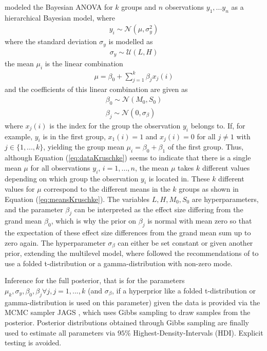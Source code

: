 \cite{Kruschke2015} modeled the Bayesian ANOVA for $k$ groups and $n$ observations $y_1,...y_n$ as a hierarchical Bayesian model, where
\begin{align}\label{eq:dataKruschke}
	y_i \sim \mathcal{N}(\mu,\sigma_y^2)
\end{align}
where the standard deviation $\sigma_y$ is modelled as
\begin{align}
	\sigma_y \sim \mathcal{U}(L,H)
\end{align}
the mean $\mu_i$ is the linear combination
\begin{align}\label{eq:meansKruschke}
	\mu=\beta_0+\sum_{j=1}^k \beta_j x_j(i)
\end{align}
and the coefficients of this linear combination are given as
\begin{align}
	\beta_0 \sim \mathcal{N}(M_0,S_0)\\
	\beta_j \sim \mathcal{N}(0,\sigma_{\beta})	
\end{align}
where $x_j(i)$ is the index for the group the observation $y_i$ belongs to. If, for example, $y_i$ is in the first group, $x_1(i)=1$ and $x_j(i)=0$ for all $j\neq 1$ with $j\in \{1,...,k\}$, yielding the group mean $\mu_i=\beta_0+\beta_1$ of the first group. Thus, although Equation (\ref{eq:dataKruschke}) seems to indicate that there is a single mean $\mu$ for all observations $y_i$, $i=1,...,n$, the mean $\mu$ takes $k$ different values depending on which group the observation $y_i$ is located in. These $k$ different values for $\mu$ correspond to the different means in the $k$ groups as shown in Equation (\ref{eq:meansKruschke}). The variables $L,H,M_0,S_0$ are hyperparameters, and the parameter $\beta_j$ can be interpreted as the effect size differing from the grand mean $\beta_0$, which is why the prior on $\beta_j$ is normal with mean zero so that the expectation of these effect size differences from the grand mean sum up to zero again. The hyperparameter $\sigma_\beta$ can either be set constant or given another prior, extending the multilevel model, where \cite{Kruschke2015} followed the recommendations of \cite{Gelman2006} to use a folded t-distribution or a gamma-distribution with non-zero mode.

Inference for the full posterior, that is for the parameters $\mu_k,\sigma_y,\beta_0,\beta_j \forall j, j=1,...,k$ (and $\sigma_\beta$, if a hyperprior like a folded t-distribution or gamma-distribution is used on this parameter) given the data is provided via the MCMC sampler JAGS \citep{Plummer2003}, which uses Gibbs sampling to draw samples from the posterior. Posterior distributions obtained through Gibbs sampling are finally used to estimate all parameters via $95\%$ Highest-Density-Intervals (HDI). Explicit testing is avoided.

